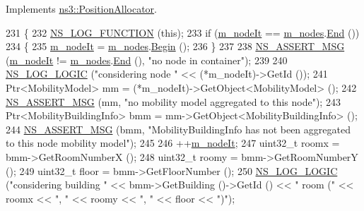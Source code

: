 Implements \hyperlink{classns3_1_1PositionAllocator_ab1d9ba3b655b9f83f4cf738ff06fbd6f}{ns3\+::\+Position\+Allocator}.


\begin{DoxyCode}
231 \{
232   \hyperlink{log-macros-disabled_8h_a90b90d5bad1f39cb1b64923ea94c0761}{NS\_LOG\_FUNCTION} (\textcolor{keyword}{this});
233   \textcolor{keywordflow}{if} (\hyperlink{classns3_1_1SameRoomPositionAllocator_ad65afb7e5bbad96eeaa1b0a61fc07fba}{m\_nodeIt} == \hyperlink{classns3_1_1SameRoomPositionAllocator_a3b63686fa8357f8000d82b60d70cf8ef}{m\_nodes}.\hyperlink{classns3_1_1NodeContainer_a8ea0bcac137597d192c5e6b95ca60464}{End} ())
234     \{
235       \hyperlink{classns3_1_1SameRoomPositionAllocator_ad65afb7e5bbad96eeaa1b0a61fc07fba}{m\_nodeIt}  = \hyperlink{classns3_1_1SameRoomPositionAllocator_a3b63686fa8357f8000d82b60d70cf8ef}{m\_nodes}.\hyperlink{classns3_1_1NodeContainer_adf0f639aff139db107526288777eb533}{Begin} ();
236     \}
237 
238   \hyperlink{assert_8h_aff5ece9066c74e681e74999856f08539}{NS\_ASSERT\_MSG} (\hyperlink{classns3_1_1SameRoomPositionAllocator_ad65afb7e5bbad96eeaa1b0a61fc07fba}{m\_nodeIt} != \hyperlink{classns3_1_1SameRoomPositionAllocator_a3b63686fa8357f8000d82b60d70cf8ef}{m\_nodes}.\hyperlink{classns3_1_1NodeContainer_a8ea0bcac137597d192c5e6b95ca60464}{End} (), \textcolor{stringliteral}{"no node in container"});
239 
240   \hyperlink{group__logging_ga88acd260151caf2db9c0fc84997f45ce}{NS\_LOG\_LOGIC} (\textcolor{stringliteral}{"considering node "} << (*m\_nodeIt)->GetId ());
241   Ptr<MobilityModel> mm = (*m\_nodeIt)->GetObject<MobilityModel> ();
242   \hyperlink{assert_8h_aff5ece9066c74e681e74999856f08539}{NS\_ASSERT\_MSG} (mm, \textcolor{stringliteral}{"no mobility model aggregated to this node"});
243   Ptr<MobilityBuildingInfo> bmm = mm->GetObject<MobilityBuildingInfo> ();
244   \hyperlink{assert_8h_aff5ece9066c74e681e74999856f08539}{NS\_ASSERT\_MSG} (bmm, \textcolor{stringliteral}{"MobilityBuildingInfo has not been aggregated to this node mobility
       model"});
245 
246   ++\hyperlink{classns3_1_1SameRoomPositionAllocator_ad65afb7e5bbad96eeaa1b0a61fc07fba}{m\_nodeIt};
247   uint32\_t roomx = bmm->GetRoomNumberX ();
248   uint32\_t roomy = bmm->GetRoomNumberY ();
249   uint32\_t floor = bmm->GetFloorNumber ();
250   \hyperlink{group__logging_ga88acd260151caf2db9c0fc84997f45ce}{NS\_LOG\_LOGIC} (\textcolor{stringliteral}{"considering building "} << bmm->GetBuilding ()->GetId () << \textcolor{stringliteral}{" room ("} << roomx 
      << \textcolor{stringliteral}{", "} << roomy << \textcolor{stringliteral}{", "} << floor << \textcolor{stringliteral}{")"});

\end{DoxyCode}
